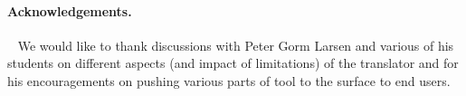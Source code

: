 \documentclass[runningheads,a4paper]{llncs}
\begin{document}
\paragraph*{Acknowledgements.}~
%
We would like to thank discussions with Peter Gorm Larsen and various of his students on different aspects (and impact of limitations) of the translator and for his encouragements on pushing various parts of tool to the surface to end users.


%


\end{document}
